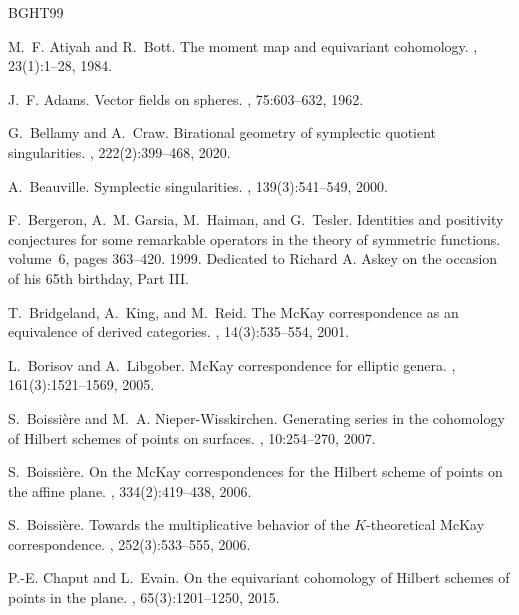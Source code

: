 \documentclass[12pt,a4paper]{amsart}
\theoremstyle{plain}
\theoremstyle{definition}
\theoremstyle{remark}
\begin{document}
\begin{thebibliography}{BGHT99}
	
	M.~F. Atiyah and R.~Bott.
	\newblock The moment map and equivariant cohomology.
	, 23(1):1--28, 1984.
	
	J.~F. Adams.
	\newblock Vector fields on spheres.
	, 75:603--632, 1962.
	
	G.~Bellamy and A.~Craw.
	\newblock Birational geometry of symplectic quotient singularities.
	, 222(2):399--468, 2020.
	
	A.~Beauville.
	\newblock Symplectic singularities.
	, 139(3):541--549, 2000.
	
	F.~Bergeron, A.~M. Garsia, M.~Haiman, and G.~Tesler.
	\newblock Identities and positivity conjectures for some remarkable operators
	in the theory of symmetric functions.
	\newblock volume~6, pages 363--420. 1999.
	\newblock Dedicated to Richard A. Askey on the occasion of his 65th birthday,
	Part III.
	
	T.~Bridgeland, A.~King, and M.~Reid.
	\newblock The {M}c{K}ay correspondence as an equivalence of derived categories.
	, 14(3):535--554, 2001.
	
	L.~Borisov and A.~Libgober.
	\newblock Mc{K}ay correspondence for elliptic genera.
	, 161(3):1521--1569, 2005.
	
	S.~Boissi\`ere and M.~A. Nieper-Wisskirchen.
	\newblock Generating series in the cohomology of {H}ilbert schemes of points on
	surfaces.
	, 10:254--270, 2007.
	
	S.~Boissi\`ere.
	\newblock On the {M}c{K}ay correspondences for the {H}ilbert scheme of points
	on the affine plane.
	, 334(2):419--438, 2006.
	
	S.~Boissi\`ere.
	\newblock Towards the multiplicative behavior of the {$K$}-theoretical
	{M}c{K}ay correspondence.
	, 252(3):533--555, 2006.
	
	P.-E. Chaput and L.~Evain.
	\newblock On the equivariant cohomology of {H}ilbert schemes of points in the
	plane.
	, 65(3):1201--1250, 2015.
	

\end{thebibliography}
\end{document}
